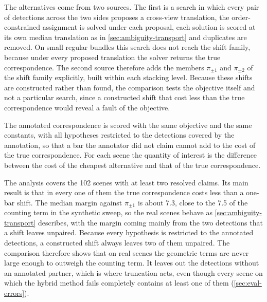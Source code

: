 \documentclass[a4paper, 12pt, twoside]{book}
\begin{document}
The alternatives come from two sources. The first is a search in which every pair of detections across the two sides proposes a cross-view translation, the order-constrained assignment is solved under each proposal, each solution is scored at its own median translation as in \cref{sec:ambiguity-transport} and duplicates are removed. On small regular bundles this search does not reach the shift family, because under every proposed translation the solver returns the true correspondence. The second source therefore adds the members $\pi_{\pm 1}$ and $\pi_{\pm 2}$ of the shift family explicitly, built within each stacking level. Because these shifts are constructed rather than found, the comparison tests the objective itself and not a particular search, since a constructed shift that cost less than the true correspondence would reveal a fault of the objective.

The annotated correspondence is scored with the same objective and the same constants, with all hypotheses restricted to the detections covered by the annotation, so that a bar the annotator did not claim cannot add to the cost of the true correspondence. For each scene the quantity of interest is the difference between the cost of the cheapest alternative and that of the true correspondence.

The analysis covers the 102 scenes with at least two resolved claims. Its main result is that in every one of them the true correspondence costs less than a one-bar shift. The median margin against $\pi_{\pm 1}$ is about 7.3, close to the 7.5 of the counting term in the synthetic sweep, so the real scenes behave as \cref{sec:ambiguity-transport} describes, with the margin coming mainly from the two detections that a shift leaves unpaired. Because every hypothesis is restricted to the annotated detections, a constructed shift always leaves two of them unpaired. The comparison therefore shows that on real scenes the geometric terms are never large enough to outweigh the counting term. It leaves out the detections without an annotated partner, which is where truncation acts, even though every scene on which the hybrid method fails completely contains at least one of them (\cref{sec:eval-errors}).
\end{document}
